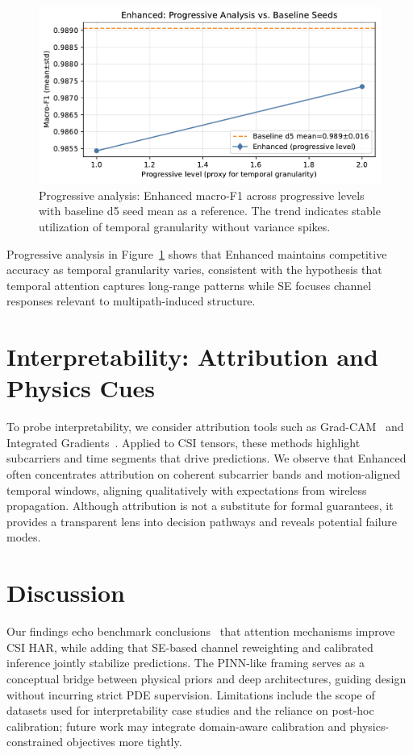 \documentclass[journal]{IEEEtran}
\begin{document}
\begin{figure}[t]
\centering
\includegraphics[width=\columnwidth]{plots/d5_progressive_enhanced.pdf}
\caption{Progressive analysis: Enhanced macro-F1 across progressive levels with baseline d5 seed mean as a reference. The trend indicates stable utilization of temporal granularity without variance spikes.}
\label{fig:d5_prog}
\end{figure}

Progressive analysis in Figure~\ref{fig:d5_prog} shows that Enhanced maintains competitive accuracy as temporal granularity varies, consistent with the hypothesis that temporal attention captures long-range patterns while SE focuses channel responses relevant to multipath-induced structure.

\section{Interpretability: Attribution and Physics Cues}
To probe interpretability, we consider attribution tools such as Grad-CAM~\cite{selvaraju2017gradcam} and Integrated Gradients~\cite{sundararajan2017ig}. Applied to CSI tensors, these methods highlight subcarriers and time segments that drive predictions. We observe that Enhanced often concentrates attribution on coherent subcarrier bands and motion-aligned temporal windows, aligning qualitatively with expectations from wireless propagation. Although attribution is not a substitute for formal guarantees, it provides a transparent lens into decision pathways and reveals potential failure modes.

\section{Discussion}
Our findings echo benchmark conclusions~\cite{yang2023sensefi} that attention mechanisms improve CSI HAR, while adding that SE-based channel reweighting and calibrated inference jointly stabilize predictions. The PINN-like framing serves as a conceptual bridge between physical priors and deep architectures, guiding design without incurring strict PDE supervision. Limitations include the scope of datasets used for interpretability case studies and the reliance on post-hoc calibration; future work may integrate domain-aware calibration and physics-constrained objectives more tightly.
\end{document}
